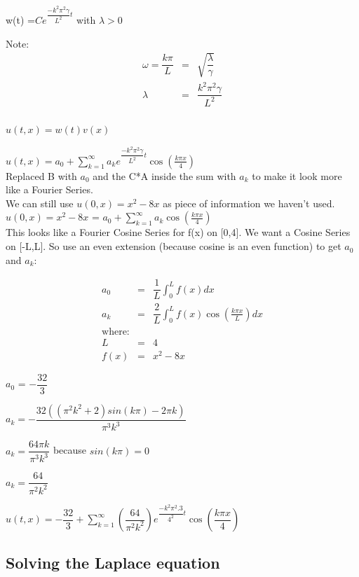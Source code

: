 \documentclass{article}
\newcommand{\bea}{\begin{eqnarray*}}
\newcommand{\eea}{\end{eqnarray*}}
\newcommand{\red}[1]{\textcolor{red}{#1}}
\begin{document}
w(t) =$Ce^{\dfrac{-k^2 \pi^2 \gamma }{L^2}t}$ with $\lambda > 0$

Note: \bea
\omega= \dfrac{k \pi}{L} &=& \sqrt{\dfrac{\lambda}{\gamma}} \\
\lambda &=& \dfrac{k^2 \pi^2 \gamma }{L^2} \\
\eea

$u(t,x) = w(t)v(x)$

$u(t,x) = a_0 + \sum_{k=1}^{\infty} a_k e^{\dfrac{-k^2 \pi^2 \gamma }{L^2}t} \cos\left(\frac{k \pi x}{4}\right)$ \\ 

Replaced B with $a_0$ and the C*A inside the sum with $a_k$ to make it look more like a Fourier Series. \\

We can still use $u(0,x)=x^2-8x$ as piece of information we haven't used.\\

$u(0,x)=x^2-8x$ = $a_0 + \sum_{k=1}^{\infty} a_k \cos\left(\frac{k \pi x}{4}\right)$ \\

This looks like a Fourier Cosine Series for f(x) on [0,4]. We want a Cosine Series on [-L,L]. So use an even extension (because cosine is an even function) to get $a_0$ and $a_k$:

\bea
a_0 &=& \dfrac{1}{L}\int_{0}^{L} f(x)dx \\
a_k &=& \dfrac{2}{L}\int_{0}^{L} f(x)\cos\left(\frac{k \pi x}{L}\right)dx \\
\mbox{where}: \\
L&=&4\\
f(x) &=& x^2-8x
\eea

$a_0$ = $-\dfrac{32}{3}$

$a_k = -\dfrac{32((\pi^2 k^2 +2)sin(k \pi) - 2 \pi k)}{\pi^3 k ^3}$

$a_k = \dfrac{64 \pi k}{\pi^3 k ^3}$ because $sin(k\pi) = 0$ \newline

$a_k = \dfrac{64}{\pi^2 k ^2}$ \newline

$u(t,x) = -\dfrac{32}{3} + \sum_{k=1}^{\infty} \left(\dfrac{64}{\pi^2 k ^2}\right) e^{\dfrac{-k^2 \pi^2 .3 }{4^2}t} \cos\left(\dfrac{k \pi x}{4}\right)$ \\ 


\subsection{Solving the Laplace equation}
 
\end{document}
